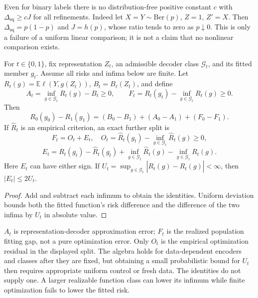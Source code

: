 Even for binary labels there is no distribution-free positive constant
$c$ with $\Delta_{\mathrm{sq}}\ge cJ$ for all refinements.
Indeed let $X=Y\sim\mathrm{Ber}(p)$, $Z=1$, $Z'=X$. Then
$\Delta_{\mathrm{sq}}=p(1-p)$ and $J=h(p)$, whose ratio tends to
zero as $p\downarrow0$. This is only a failure of a uniform linear
comparison; it is not a claim that no nonlinear comparison exists.

\begin{proposition}
\label{prop:p7-fitting-gaps}
For $t\in\{0,1\}$, fix representation $Z_t$, an admissible decoder
class $\mathcal G_t$, and its fitted member $g_t$. Assume all risks and
infima below are finite. Let $R_t(g)=\mathbb E\ell(Y,g(Z_t))$,
$B_t=B_\ell(Z_t)$, and define
\[
 A_t=\inf_{g\in\mathcal G_t}R_t(g)-B_t\ge0,\qquad
 F_t=R_t(g_t)-\inf_{g\in\mathcal G_t}R_t(g)\ge0.
\]
Then
\[
 R_0(g_0)-R_1(g_1)
 =(B_0-B_1)+(A_0-A_1)+(F_0-F_1).
\]
If $\widehat R_t$ is an empirical criterion, an exact further split is
\[
 F_t=O_t+E_t,
 \quad O_t=\widehat R_t(g_t)-\inf_{g\in\mathcal G_t}\widehat R_t(g)\ge0,
\]
\[
 E_t=R_t(g_t)-\widehat R_t(g_t)
       +\inf_{g\in\mathcal G_t}\widehat R_t(g)
       -\inf_{g\in\mathcal G_t}R_t(g).
\]
Here $E_t$ can have either sign. If
$U_t=\sup_{g\in\mathcal G_t}|R_t(g)-\widehat R_t(g)|<\infty$,
then $|E_t|\le2U_t$.
\end{proposition}
\begin{proof}
Add and subtract each infimum to obtain the identities. Uniform
deviation bounds both the fitted function's risk difference and the
difference of the two infima by $U_t$ in absolute value.
\end{proof}

$A_t$ is representation-decoder approximation error; $F_t$ is the
realized population fitting gap, not a pure optimization error.
Only $O_t$ is the empirical optimization residual in the displayed split.
The algebra holds for data-dependent encoders and classes after they are
fixed, but obtaining a small probabilistic bound for $U_t$ then requires
appropriate uniform control or fresh data. The identities do not supply
one. A larger realizable function class can lower its infimum while
finite optimization fails to lower the fitted risk.

